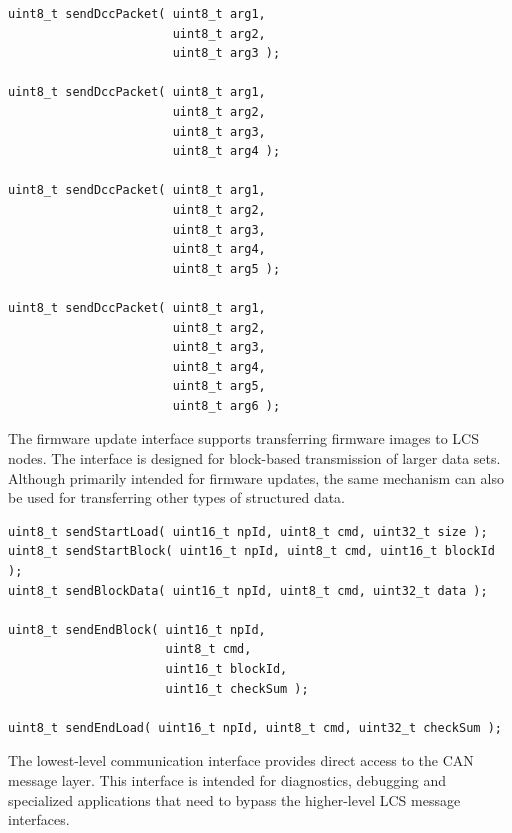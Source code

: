 \begin{lstlisting}[style=api-interface]
uint8_t sendDccPacket( uint8_t arg1,
                       uint8_t arg2,
                       uint8_t arg3 );

uint8_t sendDccPacket( uint8_t arg1,
                       uint8_t arg2,
                       uint8_t arg3,
                       uint8_t arg4 );

uint8_t sendDccPacket( uint8_t arg1,
                       uint8_t arg2,
                       uint8_t arg3,
                       uint8_t arg4,
                       uint8_t arg5 );

uint8_t sendDccPacket( uint8_t arg1,
                       uint8_t arg2,
                       uint8_t arg3,
                       uint8_t arg4,
                       uint8_t arg5,
                       uint8_t arg6 );
\end{lstlisting}



The firmware update interface supports transferring firmware images to LCS nodes.
The interface is designed for block-based transmission of larger data sets. 
Although primarily intended for firmware updates, the same mechanism can also be 
used for transferring other types of structured data.

\begin{lstlisting}[style=api-interface]
uint8_t sendStartLoad( uint16_t npId, uint8_t cmd, uint32_t size );
uint8_t sendStartBlock( uint16_t npId, uint8_t cmd, uint16_t blockId );
uint8_t sendBlockData( uint16_t npId, uint8_t cmd, uint32_t data );

uint8_t sendEndBlock( uint16_t npId,
                      uint8_t cmd,
                      uint16_t blockId,
                      uint16_t checkSum );

uint8_t sendEndLoad( uint16_t npId, uint8_t cmd, uint32_t checkSum );
\end{lstlisting}



The lowest-level communication interface provides direct access to the CAN message 
layer. This interface is intended for diagnostics, debugging and specialized 
applications that need to bypass the higher-level LCS message interfaces.

